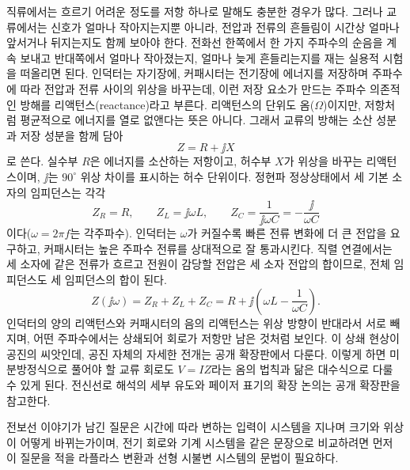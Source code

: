 직류에서는 흐르기 어려운 정도를 저항 하나로 말해도 충분한 경우가 많다.
그러나 교류에서는 신호가 얼마나 작아지는지뿐 아니라, 전압과 전류의
흔들림이 시간상 얼마나 앞서거나 뒤지는지도 함께 보아야 한다.
전화선 한쪽에서 한 가지 주파수의 순음을 계속 보내고 반대쪽에서 얼마나
작아졌는지, 얼마나 늦게 흔들리는지를 재는 실용적 시험을 떠올리면 된다.
인덕터는 자기장에, 커패시터는 전기장에 에너지를 저장하며 주파수에 따라
전압과 전류 사이의 위상을 바꾸는데, 이런 저장 요소가 만드는 주파수
의존적인 방해를 리액턴스(reactance)라고 부른다.
리액턴스의 단위도 옴($\Omega$)이지만, 저항처럼 평균적으로 에너지를 열로
없앤다는 뜻은 아니다.
그래서 교류의 방해는 소산 성분과 저장 성분을 함께 담아
\begin{equation}
  Z = R + \jj X
\end{equation}
로 쓴다.
실수부 $R$은 에너지를 소산하는 저항이고, 허수부 $X$가 위상을 바꾸는
리액턴스이며, $\jj$는 $90^\circ$ 위상 차이를 표시하는 허수 단위이다.
정현파 정상상태에서 세 기본 소자의 임피던스는 각각
\begin{equation}
  Z_R = R, \qquad
  Z_L = \jj\omega L, \qquad
  Z_C = \frac{1}{\jj\omega C} = -\frac{\jj}{\omega C}
\end{equation}
이다($\omega=2\pi f$는 각주파수).
인덕터는 $\omega$가 커질수록 빠른 전류 변화에 더 큰 전압을 요구하고,
커패시터는 높은 주파수 전류를 상대적으로 잘 통과시킨다.
직렬 연결에서는 세 소자에 같은 전류가 흐르고 전원이 감당할 전압은 세 소자
전압의 합이므로, 전체 임피던스도 세 임피던스의 합이 된다.
\begin{equation}
  Z(\jj\omega) = Z_R + Z_L + Z_C
  = R + \jj\left(\omega L - \frac{1}{\omega C}\right).
\end{equation}
인덕터의 양의 리액턴스와 커패시터의 음의 리액턴스는 위상 방향이 반대라서
서로 빼지며, 어떤 주파수에서는 상쇄되어 회로가 저항만 남은 것처럼 보인다.
이 상쇄 현상이 공진의 씨앗인데, 공진 자체의 자세한 전개는 공개 확장판에서 다룬다.
이렇게 하면 미분방정식으로 풀어야 할 교류 회로도 $V=IZ$라는 옴의 법칙과
닮은 대수식으로 다룰 수 있게 된다.
전신선로 해석의 세부 유도와 페이저 표기의 확장 논의는 공개 확장판을
참고한다.

전보선 이야기가 남긴 질문은 시간에 따라 변하는 입력이 시스템을 지나며
크기와 위상이 어떻게 바뀌는가이며, 전기 회로와 기계 시스템을 같은 문장으로
비교하려면 먼저 이 질문을 적을 라플라스 변환과 선형 시불변 시스템의
문법이 필요하다.

